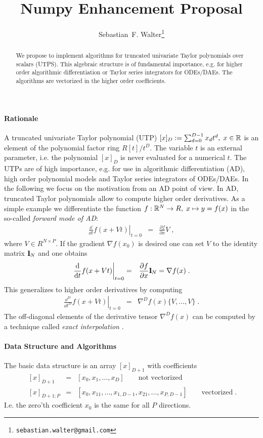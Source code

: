 \documentclass[a4paper,12pt,twoside]{article}
\title{Numpy Enhancement Proposal}
\author{Sebastian~F. Walter\footnote{\texttt{sebastian.walter@gmail.com}}}
\begin{document}
\maketitle

\begin{abstract}
We propose to implement algorithms for truncated univariate Taylor polynomials over scalars (UTPS). This algebraic structure is of fundamental importance, e.g. for higher order algorithmic differentiation or Taylor series integrators for ODEs/DAEs. The algorithms are vectorized in the higher order coefficients.
\end{abstract}
\paragraph{Rationale}
A truncated univariate Taylor polynomial (UTP) $[x]_D := \sum_{d=0}^{D-1} x_d t^d,\; x \in {\mathbb R}$ is an element of the polynomial factor ring $R[t]/t^D$. The variable $t$ is an external parameter, i.e. the polynomial $[x]_D$ is never evaluated for a numerical $t$. The UTPs are of high importance, e.g. for use in algorithmic differentiation (AD), high order polynomial models and Taylor series integrators of ODEs/DAEs. In the following we focus on the motivation from an AD point of view.
In AD, truncated Taylor polynomials allow to compute higher order derivatives. As a simple example we differentiate the function $f: {\mathbb R}^N \rightarrow R, \; x \mapsto y = f(x)$ in the so-called \emph{forward mode of AD}:
\begin{eqnarray}
\left. \frac{\dd}{\dd t} f( x + V t) \right|_{t=0} &=& \frac{\partial f}{\partial x} V \;,
\end{eqnarray}
where $V \in R^{N \times P}$. If the gradient $\nabla f(x_0)$ is desired one can set $V$ to the identity matrix $1 \!\!\! \mathrm I_N$ and one obtains 
\begin{eqnarray}
 \left. \frac{{\rm d}}{{\rm d} t} f( x + V t) \right|_{t=0} &=& \frac{\partial f}{\partial x} 1 \!\!\! \mathrm I_N = \nabla f(x)\;.
\end{eqnarray}
This generalizes to higher order derivatives by computing 
\begin{eqnarray}
\left. \frac{\dd^D}{\dd t^D} f(x + Vt) \right|_{t=0} &=& \nabla^D f(x) \{ V,\dots, V \} \;.
\end{eqnarray}
The off-diagonal elements of the derivative tensor $\nabla^D f(x)$ can be computed by a technique called \emph{exact interpolation} \cite{Griewank2008EDP}.

\paragraph{Data Structure and Algorithms}
The basic data structure is an array $[x]_{D+1}$ with coefficients
\begin{eqnarray*}
\;[x]_{D+1} &=& [x_0, x_1, \dots, x_D] \quad \quad \mbox{not vectorized} \\
\;[x]_{D+1; P} &=& [x_0, x_{11}, \dots, x_{1,D-1}, x_{21}, \dots, x_{P,D-1}] \quad \quad \mbox{vectorized} \;.
\end{eqnarray*}
I.e. the zero'th coefficient $x_0$ is the same for all $P$ directions.
\end{document}
